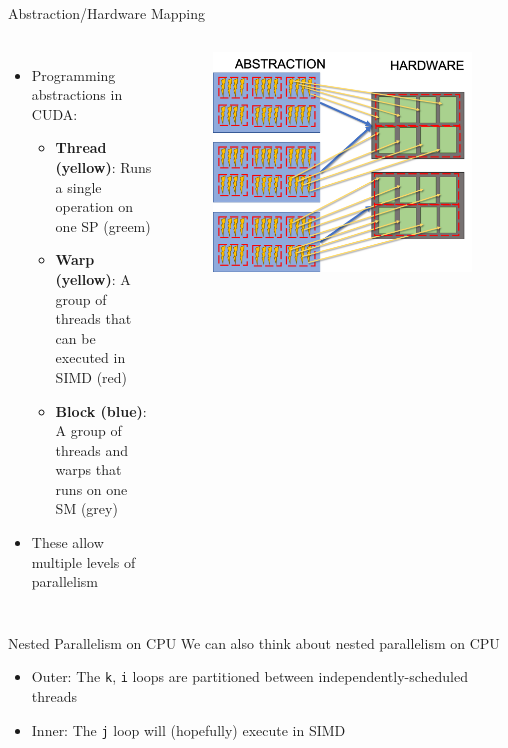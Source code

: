 \documentclass{beamer}
\begin{document}
    \begin{frame}{Abstraction/Hardware Mapping}
        \begin{columns}
            \begin{itemize}
                \item Programming abstractions in CUDA:
                \begin{itemize}
                    \item \textbf{Thread (yellow)}: Runs a single operation on one SP (greem)
                    \item \textbf{Warp (yellow)}: A group of threads that can be executed in SIMD (red)
                    \item \textbf{Block (blue)}: A group of threads and warps that runs on one SM (grey)
                \end{itemize}
                \item These allow multiple levels of parallelism
            \end{itemize}
            \begin{figure}
                \centering
                \includegraphics[width=\textwidth]{img/03/gpu-hard-abs.png}
            \end{figure}
        \end{columns}
    \end{frame}

    \begin{frame}{Nested Parallelism on CPU}
        We can also think about nested parallelism on CPU
        \begin{itemize}
            \item Outer: The \texttt{k}, \texttt{i} loops are partitioned between independently-scheduled threads
            \item Inner: The \texttt{j} loop will (hopefully) execute in SIMD
        \end{itemize}
        \begin{block}{}
            \inputminted{c}{src/dgemm-concept.c}
        \end{block}
    \end{frame}
\end{document}
